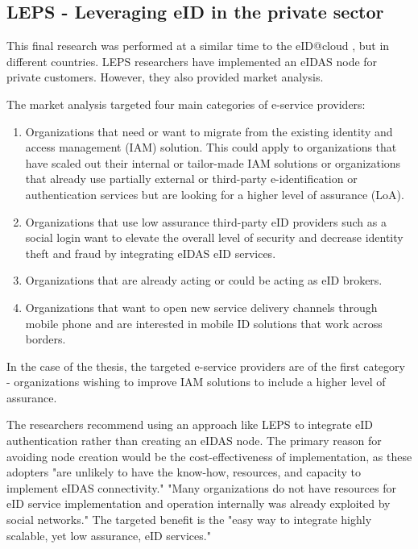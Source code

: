 \subsection{LEPS - Leveraging eID in the private sector}

This final research \cite{Martin2019303} was performed at a similar time to the eID@cloud \cite{guerola2019eid}, but in different countries. LEPS researchers 
have implemented an eIDAS node for private customers. However, they also provided market analysis.

The market analysis targeted four main categories of e-service providers:

\begin{enumerate}
    \item Organizations that need or want to migrate from the existing identity and access management (IAM) solution. This could apply to organizations that have scaled out their internal or tailor-made IAM solutions or organizations that already use partially external or third-party e-identification or authentication services but are looking for a higher level of assurance (LoA).
    \item Organizations that use low assurance third-party eID providers such as a social login want to elevate the overall level of security and decrease identity theft and fraud by integrating eIDAS eID services.
    \item Organizations that are already acting or could be acting as eID brokers.
    \item Organizations that want to open new service delivery channels through mobile phone and are interested in mobile ID solutions that work across borders.
\end{enumerate}

In the case of the thesis, the targeted e-service providers are of the first category - organizations wishing to improve IAM solutions to include a higher level of assurance.

The researchers recommend using an approach like LEPS to integrate eID authentication rather than creating an eIDAS node. The primary reason for avoiding node creation would be the cost-effectiveness of implementation, as these adopters "are unlikely to have the know-how, resources, and capacity to implement eIDAS connectivity." "Many organizations do not have resources for eID service implementation and operation internally was already exploited by social networks." The targeted benefit is the "easy way to integrate highly scalable, yet low assurance, eID services."